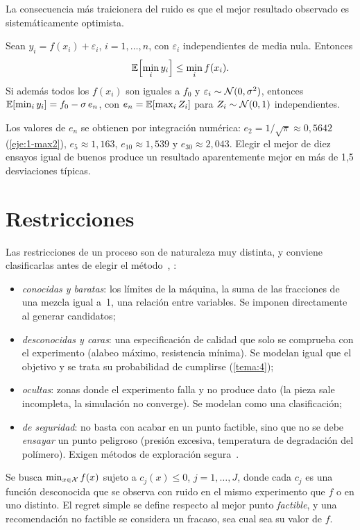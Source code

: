 La consecuencia más traicionera del ruido es que el mejor resultado observado es sistemáticamente optimista.

\begin{proposicion}\label{prop:ganador}
Sean $y_i=f(x_i)+\varepsilon_i$, $i=1,\dots,n$, con $\varepsilon_i$ independientes de media nula. Entonces
\[
\mathbb{E}\Bigl[\min_{i}y_i\Bigr]\le\min_{i}f(x_i).
\]
Si además todos los $f(x_i)$ son iguales a $f_0$ y $\varepsilon_i\sim\mathcal{N}(0,\sigma^2)$, entonces $\mathbb{E}[\min_i y_i]=f_0-\sigma\,e_n$, con $e_n=\mathbb{E}[\max_i Z_i]$ para $Z_i\sim\mathcal{N}(0,1)$ independientes.
\end{proposicion}

Los valores de $e_n$ se obtienen por integración numérica: $e_2=1/\sqrt\pi\approx 0{,}5642$ (\cref{eje:1-max2}), $e_5\approx 1{,}163$, $e_{10}\approx 1{,}539$ y $e_{30}\approx 2{,}043$. Elegir el mejor de diez ensayos igual de buenos produce un resultado aparentemente mejor en más de 1,5 desviaciones típicas.

\section{Restricciones}

Las restricciones de un proceso son de naturaleza muy distinta, y conviene clasificarlas antes de elegir el método~\cite[§11.2]{garnett}, \cite[§1.4]{kw}:
\begin{itemize}
  \item \emph{conocidas y baratas}: los límites de la máquina, la suma de las fracciones de una mezcla igual a~1, una relación entre variables. Se imponen directamente al generar candidatos;
  \item \emph{desconocidas y caras}: una especificación de calidad que solo se comprueba con el experimento (alabeo máximo, resistencia mínima). Se modelan igual que el objetivo y se trata su probabilidad de cumplirse (\cref{tema:4});
  \item \emph{ocultas}: zonas donde el experimento falla y no produce dato (la pieza sale incompleta, la simulación no converge). Se modelan como una clasificación;
  \item \emph{de seguridad}: no basta con acabar en un punto factible, sino que no se debe \emph{ensayar} un punto peligroso (presión excesiva, temperatura de degradación del polímero). Exigen métodos de exploración segura~\cite[§16.6]{kw}.
\end{itemize}

\begin{definicion}\label{def:restricciones}
Se busca $\min_{x\in\mathcal{X}}f(x)$ sujeto a $c_j(x)\le 0$, $j=1,\dots,J$, donde cada $c_j$ es una función desconocida que se observa con ruido en el mismo experimento que $f$ o en uno distinto. El regret simple se define respecto al mejor punto \emph{factible}, y una recomendación no factible se considera un fracaso, sea cual sea su valor de $f$.
\end{definicion}


